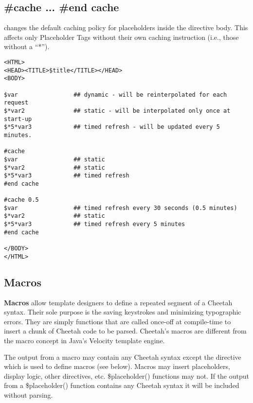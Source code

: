 \subsection{\#cache ... \#end cache}
\label{directives.cache}

 changes the default caching policy for placeholders inside the
directive body.  This affects only Placeholder Tags without their own caching
instruction (i.e., those without a ``*'').

\begin{verbatim}
<HTML>
<HEAD><TITLE>$title</TITLE></HEAD>
<BODY>

$var                ## dynamic - will be reinterpolated for each request
$*var2              ## static - will be interpolated only once at start-up
$*5*var3            ## timed refresh - will be updated every 5 minutes.

#cache
$var                ## static
$*var2              ## static
$*5*var3            ## timed refresh
#end cache

#cache 0.5
$var                ## timed refresh every 30 seconds (0.5 minutes)
$*var2              ## static
$*5*var3            ## timed refresh every 5 minutes
#end cache

</BODY>
</HTML>
\end{verbatim}

\subsection{Macros}
\label{directives.macros}


{\bf Macros} allow template designers to define a repeated segment of a Cheetah
syntax.  Their sole purpose is the saving keystrokes and minimizing typographic
errors.  They are simply functions that are called once-off at compile-time to
insert a chunk of Cheetah code to be parsed.  Cheetah's macros are different
from the macro concept in Java's Velocity template engine.

The output from a macro may contain any Cheetah syntax except the 
directive which is used to define macros (see below).  Macros may insert
placeholders, display logic, other directives, etc.  \$placeholder() functions
may not.  If the output from a \$placeholder() function contains any Cheetah
syntax it will be included without parsing.

